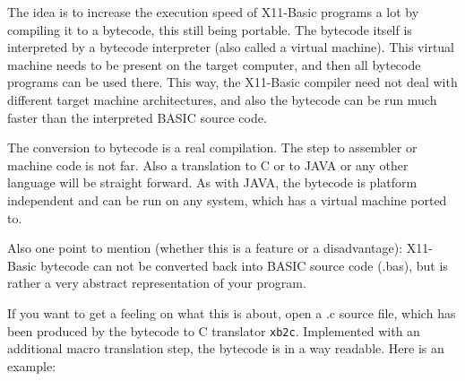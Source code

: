 The idea is to increase the execution speed of X11-Basic programs a lot by 
compiling it to a bytecode, this still being portable. The bytecode itself is 
interpreted by a bytecode interpreter (also called a virtual machine). This
virtual machine needs to be present on the target computer, and then all
bytecode programs can be used there. This way, the X11-Basic compiler need not
deal with different target machine architectures, and also the bytecode can be
run much faster than the interpreted BASIC source code. 

The conversion to bytecode is a real compilation. The step to assembler or
machine code is not far. Also a translation to C or to JAVA or any other
language will be straight forward. As with JAVA, the bytecode is platform
independent and can be run on any system, which has a virtual machine ported to.

Also one point to mention (whether this is a feature or a disadvantage): 
X11-Basic bytecode can not be converted back into BASIC source code (.bas), but
is rather a very abstract representation of your program.

If you want to get a feeling on what this is about, open a .c source file, 
which has been produced by the bytecode to C translator \verb|xb2c|. Implemented
with an  additional macro translation step, the bytecode is in a way readable.
Here is an example:

